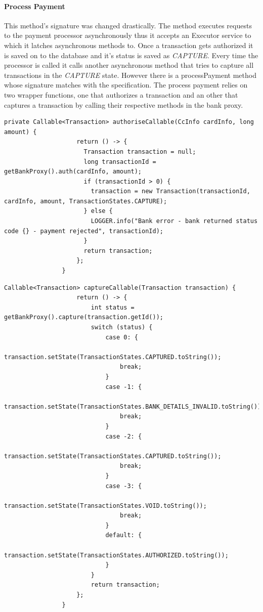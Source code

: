 \documentclass[11pt, a4paper]{article}
\begin{document}
            \paragraph{Process Payment} This method's signature was changed drastically. The method executes requests to the payment processor asynchronously thus it accepts an Executor service to which it latches asynchronous methods to. Once a transaction gets authorized it is saved on to the database and it's status is saved as \emph{CAPTURE}. Every time the processor is called it calls another asynchronous method that tries to capture all transactions in the \emph{CAPTURE} state. However there is a processPayment method whose signature matches with the specification. The process payment relies on two wrapper functions, one that authorizes a transaction and an other that captures a transaction by calling their respective methods in the bank proxy.
            \begin{lstlisting}[caption=A wrapper function that calls the bankporxy asynchronously and returns a Transaction if valid]
                private Callable<Transaction> authoriseCallable(CcInfo cardInfo, long amount) {
                    return () -> {
                      Transaction transaction = null;
                      long transactionId = getBankProxy().auth(cardInfo, amount);
                      if (transactionId > 0) {
                        transaction = new Transaction(transactionId, cardInfo, amount, TransactionStates.CAPTURE);
                      } else {
                        LOGGER.info("Bank error - bank returned status code {} - payment rejected", transactionId);
                      }
                      return transaction;
                    };
                }
            \end{lstlisting}
            \begin{lstlisting}[caption=A wrapper method that calls the bank proxy asynchronously and ]
                Callable<Transaction> captureCallable(Transaction transaction) {
                    return () -> {
                        int status = getBankProxy().capture(transaction.getId());
                        switch (status) {
                            case 0: {
                                transaction.setState(TransactionStates.CAPTURED.toString());
                                break;
                            }
                            case -1: {
                                transaction.setState(TransactionStates.BANK_DETAILS_INVALID.toString());
                                break;
                            }
                            case -2: {
                                transaction.setState(TransactionStates.CAPTURED.toString());
                                break;
                            }
                            case -3: {
                                transaction.setState(TransactionStates.VOID.toString());
                                break;
                            }
                            default: {
                                transaction.setState(TransactionStates.AUTHORIZED.toString());
                            }
                        }
                        return transaction;
                    };
                }
            \end{lstlisting}
\end{document}

